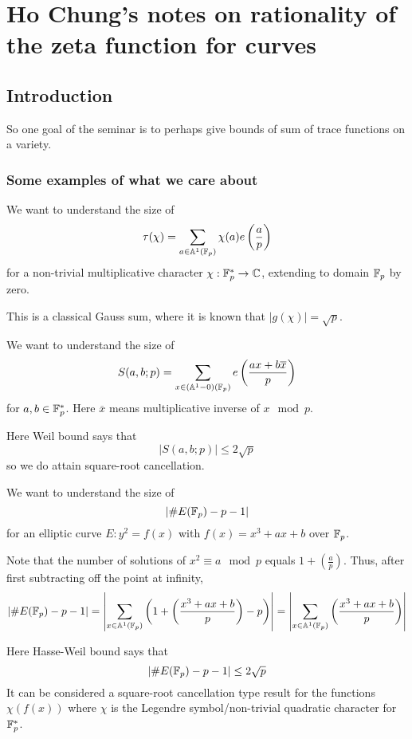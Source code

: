 \section{Ho Chung's notes on rationality of the zeta function for curves}
\subsection{Introduction}
So one goal of the seminar is to perhaps give bounds of sum of trace functions on a variety.
\subsubsection{Some examples of what we care about}
\begin{ex}
We want to understand the size of 
\[
\tau(\chi) = \sum_{a \in \mathbb{A}^1(\mathbb{F}_p)} \chi(a) e\left(\frac{a}{p}\right)
\]
for a non-trivial multiplicative character $\chi: \mathbb{F}_p^* \to \mathbb{C}$, extending to domain $\mathbb{F}_p$ by zero.

This is a classical Gauss sum, where it is known that $|g(\chi)| = \sqrt{p}$.
\end{ex}
\begin{ex}
We want to understand the size of 
\[
S(a,b;p) = \sum_{x \in (\mathbb{A}^1 - 0)(\mathbb{F}_p)} e\left(\frac{ax + b\overline{x}}{p}\right)
\]
for $a,b \in \mathbb{F}_p^*$. Here $\overline{x}$ means multiplicative inverse of $x \mod p$.

Here Weil bound says that 
\[
|S(a,b;p)| \leq 2\sqrt{p}
\]
so we do attain square-root cancellation.
\end{ex}
\begin{ex}
We want to understand the size of 
\[
|\#E(\mathbb{F}_p) - p - 1|
\]
for an elliptic curve $E: y^2 = f(x)$ with $f(x) = x^3+ax+b$ over $\mathbb{F}_p$. 

Note that the number of solutions of $x^2 \equiv a \mod p$ equals $\displaystyle 1 + \left(\frac{a}{p}\right)$. Thus, after first subtracting off the point at infinity,
\[
|\#E(\mathbb{F}_p) - p - 1| = \left| \sum_{x \in \mathbb{A}^1(\mathbb{F}_p)} \left(1 + \left(\frac{x^3+ax+b}{p}\right) - p \right) \right| = \left|\sum_{x \in \mathbb{A}^1(\mathbb{F}_p)} \left(\frac{x^3+ax+b}{p}\right) \right|
\]

Here Hasse-Weil bound says that 
\[
|\#E(\mathbb{F}_p) - p - 1| \leq 2\sqrt{p}
\]
It can be considered a square-root cancellation type result for the functions $\chi(f(x))$ where $\chi$ is the Legendre symbol/non-trivial quadratic character for $\mathbb{F}_p^*$.
\end{ex}

